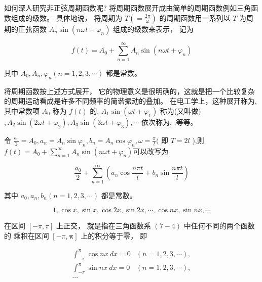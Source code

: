 如何深人研究非正弦周期函数呢? 将周期函数展开成由简单的周期函数例如三角函数组成的级数。 具体地说， 将周期为 $ T\left(=\frac{2 \pi}{\omega}\right) $ 的周期函数用一系列以 $ T $ 为周 期的正弦函数 $ A_{n} \sin \left(n \omega t+\varphi_{n}\right) $ 组成的级数来表示， 记为

\begin{equation} f(t)=A_{0}+\sum_{n=1}^{\infty} A_{n} \sin \left(n \omega t+\varphi_{n}\right) \end{equation}

其中 $ A_{0}, A_{n}, \varphi_{n}(n=1,2,3, \cdots) $ 都是常数。

将周期函数按上述方式展开， 它的物理意义是很明确的，这就是把一个比较复杂的周期运动看成是许多不同频率的简谐振动的叠加。 在电工学上，这种展开称为,其中常数项 $ A_{0} $ 称为 $ f(t) $ 的, $ A_{1} \sin \left(\omega t+\varphi_{1}\right) $ 称为(又叫做) $ , A_{2} \sin \left(2 \omega t+\varphi_{2}\right), A_{3} \sin \left(3 \omega t+\varphi_{3}\right), \cdots $ 依次称为, ,等等。

\begin{definition}[三角级数]
    令 $ \frac{a_{0}}{2}=A_{0}, a_{n}=A_{n} \sin \varphi_{n}, b_{n}=A_{n} \cos \varphi_{n}, \omega=\frac{\pi}{l}( $ 即 $ T=2 l $ ),则$ f(t)=A_{0}+\sum_{n=1}^{\infty} A_{n} \sin \left(n \omega t+\varphi_{n}\right) $可以改写为

    \begin{equation} \frac{a_{0}}{2}+\sum_{n=1}^{\infty}\left(a_{n} \cos \frac{n \pi t}{l}+b_{n} \sin \frac{n \pi t}{l}\right) \end{equation}

    其中 $ a_{0}, a_{n}, b_{n}(n=1,2,3, \cdots) $ 都是常数。 
\end{definition}

\begin{definition}[三角函数系（基波）]
    \begin{equation} 1, \cos x, \sin x, \cos 2 x, \sin 2 x, \cdots, \cos n x, \sin n x, \cdots \end{equation}

    在区间 $ [-\pi, \pi] $ 上正交， 就是指在三角函数系 $ (7-4) $ 中任何不同的两个函数的 乘积在区间 $ [-\pi, \boldsymbol{\pi}] $ 上的积分等于零， 即

    \begin{equation} \begin{array}{ll}\int_{-\pi}^{\pi} \cos n x {~d} x=0 & (n=1,2,3, \cdots), \\ \int_{-\pi}^{\pi} \sin n x {~d} x=0 & (n=1,2,3, \cdots),\\ \cdots
    \end{array} \end{equation}
\end{definition}

